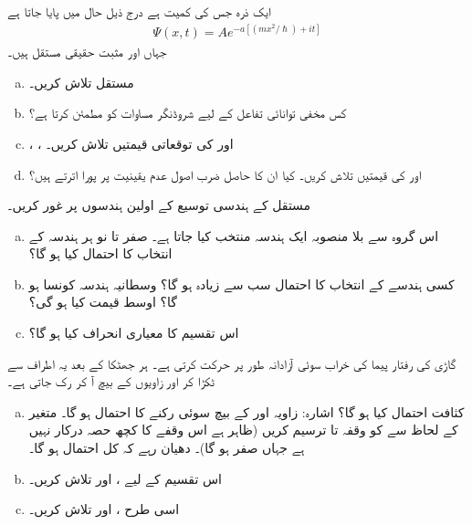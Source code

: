ایک ذرہ جس کی کمیت  ہے درج ذیل حال میں پایا جاتا ہے 
\begin{align*}
\Psi (x,t)=Ae^{-a[(mx^{2}/\hslash)+it]}
\end{align*}
جہاں  اور  مثبت حقیقی مستقل ہیں۔
\begin{enumerate}[a.]
\item
مستقل  تلاش کریں۔
\item
کس مخفی توانائی تفاعل  کے لیے  شروڈنگر مساوات کو مطمئن کرتا ہے؟
\item
{}، ،  اور  کی توقعاتی قیمتیں تلاش کریں۔
\item
{} اور  کی قیمتیں تلاش کریں۔ کیا ان کا حاصل ضرب اصول عدم یقینیت پر پورا اترتے ہیں؟
\end{enumerate}
مستقل  کے  ہندسی  توسیع  کے اولین  ہندسوں   پر غور کریں۔
\begin{enumerate}[a.]
\item
اس گروہ سے بلا منصوبہ ایک ہندسہ  منتخب کیا جاتا ہے۔ صفر تا نو ہر ہندسہ کے انتخاب کا احتمال کیا ہو گا؟
\item
 کسی ہندسے کے انتخاب کا احتمال سب سے زیادہ ہو گا؟ وسطانیہ ہندسہ کونسا ہو گا؟ اوسط قیمت کیا ہو گی؟
\item
اس تقسیم کا معیاری انحراف کیا ہو گا؟
\end{enumerate}
گاڑی کی رفتار پیما کی خراب سوئی آزادانہ  طور پر حرکت کرتی ہے۔ ہر جھٹکا کے بعد یہ اطراف سے ٹکڑا کر  اور  زاویوں کے بیچ آ کر رک جاتی ہے۔
\begin{enumerate}[a.] 
\item

کثافت احتمال  کیا ہو گا؟ اشارہ: زاویہ  اور  کے بیچ سوئی رکنے کا احتمال  ہو گا۔ متغیر  کے لحاظ سے  کو وقفہ تا  ترسیم کریں (ظاہر ہے اس وقفے کا کچھ حصہ درکار نہیں ہے جہاں  صفر ہو گا)۔ دھیان رہے کہ کل احتمال  ہو گا۔
\item
اس تقسیم کے لیے ،  اور  تلاش  کریں۔
\item
 اسی طرح ،  اور  تلاش کریں۔
\end{enumerate}


